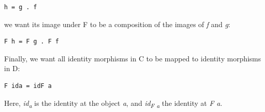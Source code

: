 \begin{Verbatim}[commandchars=\\\{\}]
h = g . f
\end{Verbatim}
we want its image under F to be a composition of the images of \emph{f}
and \emph{g}:

\begin{Verbatim}[commandchars=\\\{\}]
F h = F g . F f
\end{Verbatim}

\begin{figure}[H]
\centering
{}
\end{figure}

\noindent
Finally, we
want all identity morphisms in C to be mapped to identity morphisms in
D:

\begin{Verbatim}[commandchars=\\\{\}]
F ida = idF a
\end{Verbatim}
Here, \emph{id\textsubscript{a}} is the identity at the object \emph{a},
and \emph{id\textsubscript{F a}} the identity at \emph{F a}.

\begin{figure}
\centering
{}
\end{figure}

